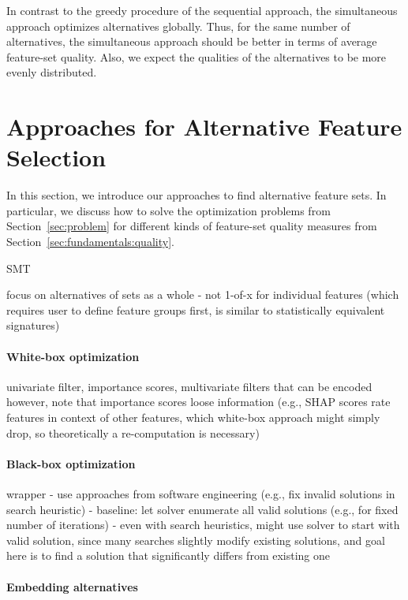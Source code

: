 \documentclass{article}
\theoremstyle{definition}
\begin{document}
In contrast to the greedy procedure of the sequential approach, the simultaneous approach optimizes alternatives globally.
Thus, for the same number of alternatives, the simultaneous approach should be better in terms of average feature-set quality.
Also, we expect the qualities of the alternatives to be more evenly distributed.

\section{Approaches for Alternative Feature Selection}
\label{sec:approaches}

In this section, we introduce our approaches to find alternative feature sets.
In particular, we discuss how to solve the optimization problems from Section~\ref{sec:problem} for different kinds of feature-set quality measures from Section~\ref{sec:fundamentals:quality}.

SMT \cite{barrett2018satisfiability}

focus on alternatives of sets as a whole - not 1-of-x for individual features (which requires user to define feature groups first, is similar to statistically equivalent signatures)

\paragraph{White-box optimization}

univariate filter, importance scores, multivariate filters that can be encoded
however, note that importance scores loose information (e.g., SHAP scores rate features in context of other features, which white-box approach might simply drop, so theoretically a re-computation is necessary)

\paragraph{Black-box optimization}

wrapper
- use approaches from software engineering (e.g., fix invalid solutions in search heuristic)
- baseline: let solver enumerate all valid solutions (e.g., for fixed number of iterations)
- even with search heuristics, might use solver to start with valid solution, since many searches slightly modify existing solutions, and goal here is to find a solution that significantly differs from existing one

\paragraph{Embedding alternatives}
\end{document}
